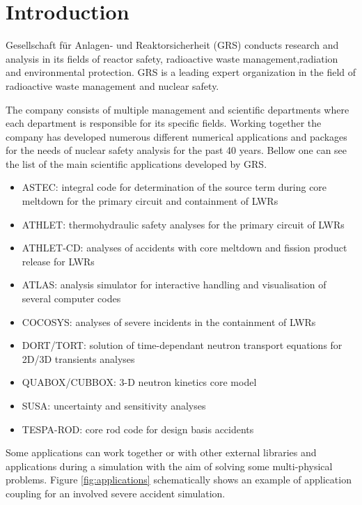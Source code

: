 

\chapter{Introduction}\label{chapter:introduction}

Gesellschaft für Anlagen- und Reaktorsicherheit (GRS) conducts research and analysis in its fields of reactor safety, radioactive waste management,radiation and environmental protection. GRS is a leading expert organization in the field of radioactive waste management and nuclear safety.

The company consists of multiple management and scientific departments where each department is responsible for its specific fields. Working together the company has developed numerous different numerical applications and packages for the needs of nuclear safety analysis for the past 40 years. Bellow one can see the list of the  main scientific applications developed by GRS.
 
\begin{itemize}
	\item ASTEC: integral code for determination of the source term during core meltdown for the primary circuit and containment of LWRs
	\item ATHLET: thermohydraulic safety analyses for the primary circuit of  LWRs
	\item ATHLET-CD: analyses of accidents with core meltdown and fission product release for LWRs
	\item ATLAS: analysis simulator for interactive handling and visualisation of several computer codes
	\item COCOSYS: analyses of severe incidents in the containment of LWRs
	\item DORT/TORT: solution of time-dependant neutron transport equations for 2D/3D transients analyses
	\item QUABOX/CUBBOX: 3-D neutron kinetics core model
	\item SUSA: uncertainty and sensitivity analyses
	\item TESPA-ROD: core rod code for design basis accidents
\end{itemize}


Some applications can work together or with other external libraries and applications during a simulation with the aim of solving some multi-physical problems. Figure \ref{fig:applications} schematically shows an example of application coupling for an involved severe accident simulation.\par

